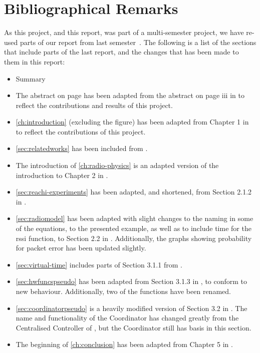 \chapter{Bibliographical Remarks}
As this project, and this report, was part of a multi-semester project, we have re-used parts of
our report from last semester~\cite{paper:massivesims1}. The following is a list of the sections that include
parts of the last report, and the changes that has been made to them in this report:

\begin{itemize}
    \item Summary
    \item The abstract on page \pageref{page:titlepage} has been adapted from the abstract on page iii in
          \cite{paper:massivesims1} to reflect the contributions and results of this project.
    \item \autoref{ch:introduction} (excluding the figure) has been adapted from Chapter 1 in
          \cite{paper:massivesims1} to reflect the contributions of this project.
    \item \autoref{sec:relatedworks} has been included from \cite{paper:massivesims1}.
    \item The introduction of \autoref{ch:radio-physics} is an adapted version of the introduction to Chapter
          2 in \cite{paper:massivesims1}.
    \item \autoref{sec:reachi-experiments} has been adapted, and shortened, from Section 2.1.2 in
          \cite{paper:massivesims1}.
    \item \autoref{sec:radiomodel} has been adapted with slight changes to the naming in some of the
          equations, to the presented example, as well as to include time for the \gls{rssi} function, to
          Section 2.2 in \cite{paper:massivesims1}. Additionally, the graphs showing probability for packet
          error has been updated slightly.
    \item \autoref{sec:virtual-time} includes parts of Section 3.1.1 from \cite{paper:massivesims1}.
    \item \autoref{sec:hwfuncspseudo} has been adapted from Section 3.1.3 in \cite{paper:massivesims1}, to
          conform to new behaviour. Additionally, two of the functions have been renamed.
    \item \autoref{sec:coordinatorpseudo} is a heavily modified version of Section 3.2 in
          \cite{paper:massivesims1}. The name and functionality of the Coordinator has changed greatly from
          the Centralised Controller of \cite{paper:massivesims1}, but the Coordinator still has basis in this
          section.
    \item The beginning of \autoref{ch:conclusion} has been adapted from Chapter 5 in
          \cite{paper:massivesims1}.
\end{itemize}
